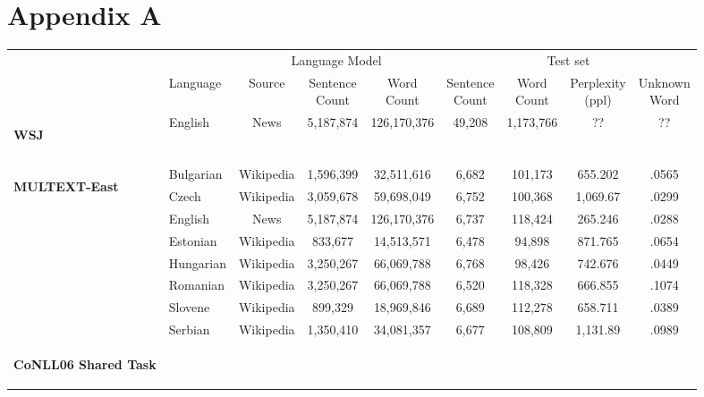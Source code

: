 \appendix
\section{Appendix A}
\label{app:lm}

\begin{table}[h]
  \begin{tabular}{l|l|c|c|c|c|c|c|c|}
    \cline{2-9}
    & & \multicolumn{3}{c|}{Language Model} & \multicolumn{4}{c|}{Test set}\\    \cline{2-9}
    & Language & Source & \specialcell{Sentence\\Count} & \specialcell{Word\\Count} & \specialcell{Sentence\\Count} & \specialcell{Word\\Count} & \specialcell{Perplexity\\(ppl)} & \specialcell{Unknown\\Word} \\ \cline{1-9}
    \multirow{1}{*}{\begin{sideways}\textbf{WSJ}\end{sideways}} 
    &English & News & 5,187,874 & 126,170,376 & 49,208 & 1,173,766 & ?? & ??\\
    & & & & && & &\\\hline
    \multirow{8}{*}{\begin{sideways}\textbf{MULTEXT-East}\end{sideways}}
    &Bulgarian& Wikipedia &1,596,399 & 32,511,616  & 6,682 & 101,173 & 655.202 & .0565\\
    &Czech & Wikipedia &3,059,678 & 59,698,049 & 6,752 & 100,368 & 1,069.67 & .0299\\
    &English & News & 5,187,874 & 126,170,376 & 6,737 & 118,424 & 265.246 & .0288\\
    &Estonian & Wikipedia &833,677 & 14,513,571 & 6,478 & 94,898 & 871.765 & .0654\\
    &Hungarian & Wikipedia &3,250,267& 66,069,788 & 6,768 & 98,426 & 742.676 & .0449\\
    &Romanian & Wikipedia &3,250,267&66,069,788  & 6,520 & 118,328 & 666.855 & .1074\\
    &Slovene & Wikipedia & 899,329&18,969,846 & 6,689 & 112,278 & 658.711 & .0389\\
    &Serbian & Wikipedia & 1,350,410 & 34,081,357 & 6,677 & 108,809 & 1,131.89 & .0989\\
    \hline %
    \multirow{10}{*}{\begin{sideways}\textbf{CoNLL06 Shared Task}\end{sideways}}

\end{tabular}
\end{table}

